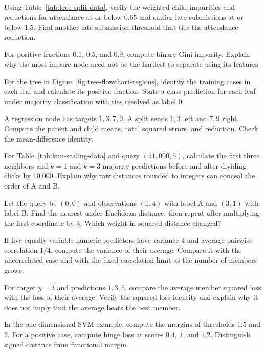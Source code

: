 \begin{exercises}
\item {}Using Table~\ref{tab:tree-split-data}, verify the weighted child impurities and reductions for attendance at or below $0.65$ and earlier late submissions at or below $1.5$. Find another late-submission threshold that ties the attendance reduction.
\item {}For positive fractions $0.1$, $0.5$, and $0.9$, compute binary Gini impurity. Explain why the most impure node need not be the hardest to separate using its features.
\item {}For the tree in Figure~\ref{fig:tree-flowchart-regions}, identify the training cases in each leaf and calculate its positive fraction. State a class prediction for each leaf under majority classification with ties resolved as label $0$.
\item {}A regression node has targets $1,3,7,9$. A split sends $1,3$ left and $7,9$ right. Compute the parent and child means, total squared errors, and reduction. Check the mean-difference identity.
\item {}For Table~\ref{tab:knn-scaling-data} and query $(51{,}000,5)$, calculate the first three neighbors and $k=1$ and $k=3$ majority predictions before and after dividing clicks by 10{,}000. Explain why raw distances rounded to integers can conceal the order of A and B.
\item {}Let the query be $(0,0)$ and observations $(1,4)$ with label A and $(3,1)$ with label B. Find the nearest under Euclidean distance, then repeat after multiplying the first coordinate by $3$. Which weight in squared distance changed?
\item {}If five equally variable numeric predictors have variance $4$ and average pairwise correlation $1/4$, compute the variance of their average. Compare it with the uncorrelated case and with the fixed-correlation limit as the number of members grows.
\item {}For target $y=3$ and predictions $1,3,5$, compare the average member squared loss with the loss of their average. Verify the squared-loss identity and explain why it does not imply that the average beats the best member.
\item {}In the one-dimensional SVM example, compute the margins of thresholds $1.5$ and $2$. For a positive case, compute hinge loss at scores $0.4$, $1$, and $1.2$. Distinguish signed distance from functional margin.

\end{exercises}
